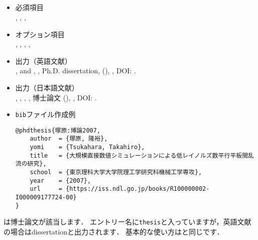 \documentclass[a4paper,fleqn,uplatex,dvipdfmx]{jsarticle}
\begin{document}
\subsection{\ttphdthesis}
\label{ssec:phdthesis}
\begin{tcolorbox}[enhanced, title=\ttphdthesis, drop fuzzy shadow]
    \begin{itemize}
        \item 必須項目 \\
        \ttauthor, \tttitle, \ttschool, \ttyear
        \item オプション項目 \\
        \ttaddress, \ttmonth, \ttnote, \ttkey, \ttdoi
        \item 出力（英語文献） \\
            \colorbox[gray]{0.8}{\ttauthorf}, \colorbox[gray]{0.8}{\ttauthors} and \colorbox[gray]{0.8}{\ttauthort}, \colorbox[gray]{0.8}{\tttitle}, Ph.D. dissertation, \colorbox[gray]{0.8}{\ttschool} (\colorbox[gray]{0.8}{\ttyear}), \colorbox[gray]{0.8}{\ttnote}, DOI: \colorbox[gray]{0.8}{\ttdoi}.
        \item 出力（日本語文献） \\
            \colorbox[gray]{0.8}{\ttauthorf}, \colorbox[gray]{0.8}{\ttauthors}, \colorbox[gray]{0.8}{\ttauthort}, \colorbox[gray]{0.8}{\tttitle}, \colorbox[gray]{0.8}{\ttschool}博士論文 (\colorbox[gray]{0.8}{\ttyear}), \colorbox[gray]{0.8}{\ttnote}, DOI: \colorbox[gray]{0.8}{\ttdoi}.
        \item \verb|bib|ファイル作成例 \vspace{-3mm}
\begin{verbatim}
@phdthesis{塚原:博論2007,
    author  = {塚原, 隆裕},
    yomi    = {Tsukahara, Takahiro},
    title   = {大規模直接数値シミュレーションによる低レイノルズ数平行平板間乱流の研究},
    school  = {東京理科大学大学院理工学研究科機械工学専攻},
    year    = {2007},
    url     = {https://iss.ndl.go.jp/books/R100000002-I000009177724-00}
}
\end{verbatim}
    \end{itemize}
\end{tcolorbox}

\ttphdthesis は博士論文が該当します．
エントリー名に\verb|thesis|と入っていますが，英語文献の場合はdissertationと出力されます．
基本的な使い方は\ttmastersthesis と同じです．
\end{document}
